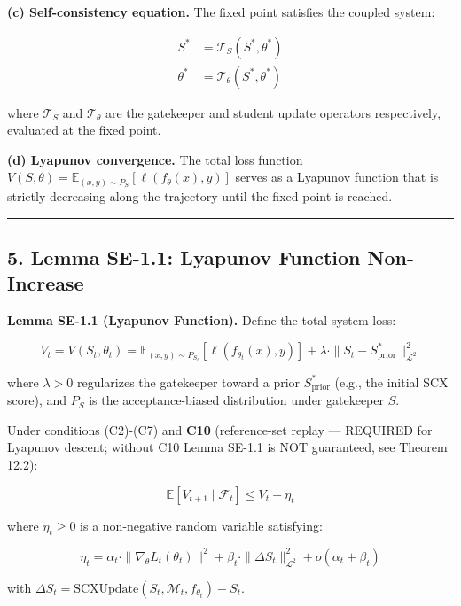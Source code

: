 \documentclass[
  12pt,
]{article}
\begin{document}
\textbf{(c) Self-consistency equation.} The fixed point satisfies the
coupled system:

\[
\begin{aligned}
S^* &= \mathcal{T}_S(S^*, \theta^*) \\
\theta^* &= \mathcal{T}_\theta(S^*, \theta^*)
\end{aligned}
\]

where \(\mathcal{T}_S\) and \(\mathcal{T}_\theta\) are the gatekeeper
and student update operators respectively, evaluated at the fixed point.

\textbf{(d) Lyapunov convergence.} The total loss function
\(V(S, \theta) = \mathbb{E}_{(x,y) \sim P_S}[\ell(f_\theta(x), y)]\)
serves as a Lyapunov function that is strictly decreasing along the
trajectory until the fixed point is reached.

\begin{center}\rule{0.5\linewidth}{0.5pt}\end{center}

\subsection{5. Lemma SE-1.1: Lyapunov Function
Non-Increase}\label{lemma-se-1.1-lyapunov-function-non-increase}

\textbf{Lemma SE-1.1 (Lyapunov Function).} Define the total system loss:

\[
V_t = V(S_t, \theta_t) = \mathbb{E}_{(x,y) \sim P_{S_t}}[\ell(f_{\theta_t}(x), y)] + \lambda \cdot \|S_t - S^*_{\text{prior}}\|^2_{\mathcal{L}^2}
\]

where \(\lambda > 0\) regularizes the gatekeeper toward a prior
\(S^*_{\text{prior}}\) (e.g., the initial SCX score), and \(P_S\) is the
acceptance-biased distribution under gatekeeper \(S\).

Under conditions (C2)-(C7) and \textbf{C10} (reference-set replay ---
REQUIRED for Lyapunov descent; without C10 Lemma SE-1.1 is NOT
guaranteed, see Theorem 12.2):

\[
\mathbb{E}[V_{t+1} \mid \mathcal{F}_t] \leq V_t - \eta_t
\]

where \(\eta_t \geq 0\) is a non-negative random variable satisfying:

\[
\eta_t = \alpha_t \cdot \|\nabla_{\theta} L_t(\theta_t)\|^2 + \beta_t \cdot \|\Delta S_t\|^2_{\mathcal{L}^2} + o(\alpha_t + \beta_t)
\]

with
\(\Delta S_t = \text{SCXUpdate}(S_t, \mathcal{M}_t, f_{\theta_t}) - S_t\).
\end{document}
